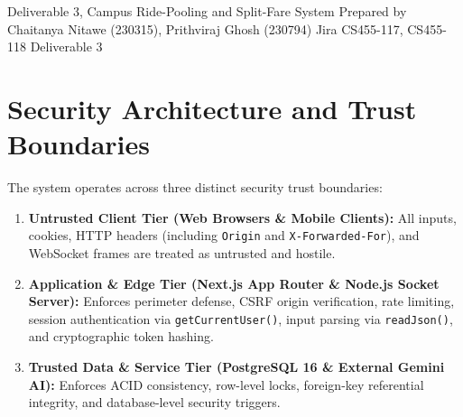 \documentclass[10pt]{article}
\begin{document}
  {Deliverable 3, Campus Ride-Pooling and Split-Fare System}
  {Prepared by Chaitanya Nitawe (230315), Prithviraj Ghosh (230794) \quad Jira CS455-117, CS455-118 \quad Deliverable 3}


\section{Security Architecture and Trust Boundaries}
The system operates across three distinct security trust boundaries:
\begin{enumerate}
  \item \textbf{Untrusted Client Tier (Web Browsers \& Mobile Clients):} All inputs, cookies, HTTP headers (including \texttt{Origin} and \texttt{X-Forwarded-For}), and WebSocket frames are treated as untrusted and hostile.
  \item \textbf{Application \& Edge Tier (Next.js App Router \& Node.js Socket Server):} Enforces perimeter defense, CSRF origin verification, rate limiting, session authentication via \texttt{getCurrentUser()}, input parsing via \texttt{readJson()}, and cryptographic token hashing.
  \item \textbf{Trusted Data \& Service Tier (PostgreSQL 16 \& External Gemini AI):} Enforces ACID consistency, row-level locks, foreign-key referential integrity, and database-level security triggers.
\end{enumerate}
\end{document}
